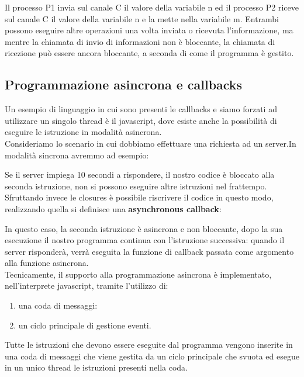 \documentclass[10pt,a4paper,italian]{report}
\begin{document}
\noindent Il processo P1 invia sul canale C il valore della variabile n ed il processo P2 riceve sul canale C il valore della variabile n e la mette nella variabile m. Entrambi possono eseguire altre operazioni una volta inviata o ricevuta l'informazione, ma mentre la chiamata di invio di informazioni non è bloccante, la chiamata di ricezione può essere ancora bloccante, a seconda di come il programma è gestito.


\subsection{Programmazione asincrona e callbacks}

\noindent Un esempio di linguaggio in cui sono presenti le callbacks e siamo forzati ad utilizzare un singolo thread è il javascript, dove esiste anche la possibilità di eseguire le istruzione in modalità asincrona.\\

\noindent Consideriamo lo scenario in cui dobbiamo effettuare una richiesta ad un server.In modalità sincrona avremmo ad esempio:



\noindent Se il server impiega 10 secondi a rispondere, il nostro codice è bloccato alla seconda istruzione, non si possono eseguire altre istruzioni nel frattempo. Sfruttando invece le closures è possibile riscrivere il codice in questo modo, realizzando quella si definisce una \textbf{asynchronous callback}:



\noindent In questo caso, la seconda istruzione è asincrona e non bloccante, dopo la sua esecuzione il nostro programma continua con l'istruzione successiva: quando il server risponderà, verrà eseguita la funzione di callback passata come argomento alla funzione asincrona.\\

\noindent Tecnicamente, il supporto alla programmazione asincrona è implementato, nell'interprete javascript, tramite l'utilizzo di:

\begin{enumerate}
	\item una coda di messaggi:
	\item un ciclo principale di gestione eventi.
\end{enumerate}

\noindent Tutte le istruzioni che devono essere eseguite dal programma vengono inserite in una coda di messaggi che viene gestita da un ciclo principale che svuota ed esegue in un unico thread le istruzioni presenti nella coda.\\
\end{document}
